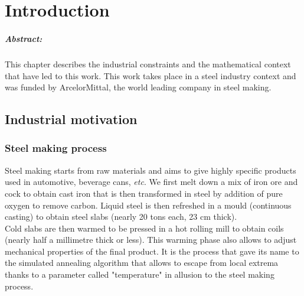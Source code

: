 \documentclass[12pt,a4paper]{report}
\begin{document}
\chapter{Introduction}
	\paragraph{Abstract:} This chapter describes the industrial constraints and the mathematical context that have led to this work. This work takes place in a steel industry context and was funded by ArcelorMittal, the world leading company in steel making. 
\section{Industrial motivation}
\subsection{Steel making process}
	Steel making starts from raw materials and aims to give highly specific products used in automotive, beverage cans, {\it etc}.
	We first melt down a mix of iron ore and cock to obtain cast iron that is then transformed in steel by addition of pure oxygen to remove carbon. Liquid steel is then refreshed in a mould (continuous casting) to obtain steel slabs (nearly 20 tons each, 23 cm thick). \\
	
	Cold slabs are then warmed to be pressed in a hot rolling mill to obtain coils (nearly half a  millimetre thick or less). This warming phase also allows to adjust mechanical properties of the final product. It is the process that gave its name to the simulated annealing algorithm that allows to escape from local extrema thanks to a parameter called "temperature" in allusion to the steel making process.  \\
	 
\end{document}
